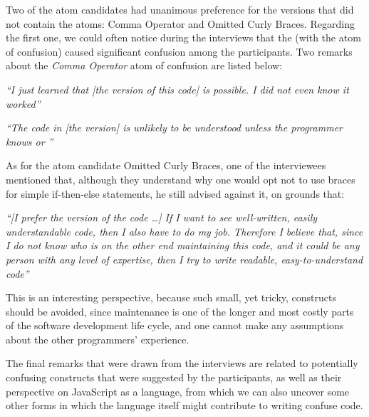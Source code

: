 Two of the atom candidates had unanimous preference for the
versions that did not contain the atoms: Comma Operator and
Omitted Curly Braces. Regarding the first one, we could
often notice during the interviews that
the \emph{\lhs} (with the atom of confusion) caused significant
confusion among the participants. Two remarks about
the \emph{Comma Operator} atom of confusion are listed below:

\begin{mq}
\emph{``I just learned that [the \lhs version of this code] is possible. I did not even know it worked''}
\end{mq}

\begin{mq}
\emph{``The code in [the \lhs version] is unlikely to be understood unless the programmer knows \clang or \cpplang''}
\end{mq}

As for the atom candidate Omitted Curly Braces, one of the interviewees mentioned that, although they understand why one would opt not to use braces for simple if-then-else statements, he still advised against it, on grounds that:

\begin{mq}
\emph{``[I prefer the \rhs version of the code \ldots] If I want to see well-written, easily understandable code, then I also have to do my job. Therefore I believe that, since I do not know who is on the other end maintaining this code, and it could be any person with any level of expertise, then I try to write readable, easy-to-understand code''}
\end{mq}

This is an interesting perspective, because such small, yet tricky, constructs should be avoided, since maintenance is one of the longer and most costly parts of the software development life cycle, and one cannot make any assumptions about the other programmers' experience.


The final remarks that were drawn from the interviews are related to potentially confusing constructs that were suggested by the participants, as well as their perspective on JavaScript as a language, from which we can also uncover some other forms in which the language itself might contribute to writing confuse code.

